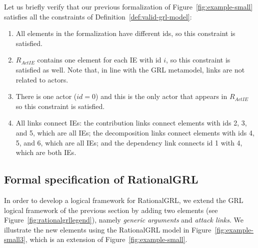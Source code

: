 Let us briefly verify that our previous formalization of Figure~\ref{fig:example-small} satisfies all the constraints of Definition~\ref{def:valid-grl-model}:
\begin{enumerate}
\item All elements in the formalization have different ids, so this constraint is satisfied.
\item $R_{ActIE}$ contains one element for each IE with id $i$, so this constraint is satisfied as well. Note that, in line with the GRL metamodel, links are not related to actors. 
\item There is one actor ($id=0$) and this is the only actor that appears in $R_{ActIE}$ so this constraint is satisfied.
\item All links connect IEs: the contribution links connect elements with ids 2, 3, and 5, which are all IEs; the decomposition links connect elements with ids 4, 5, and 6, which are all IEs; and the dependency link connects id 1 with 4, which are both IEs.
\end{enumerate}

\subsection{Formal specification of RationalGRL}
\label{sect:formalframework:rationalgrl}

In order to develop a logical framework for RationalGRL, we extend the GRL logical framework of the previous section by adding two elements (see Figure~\ref{fig:rationalgrllegend}), namely \emph{generic arguments} and \emph{attack links}. We illustrate the new elements using the RationalGRL model in Figure~\ref{fig:example-small3}, which is an extension of Figure~\ref{fig:example-small}. 

